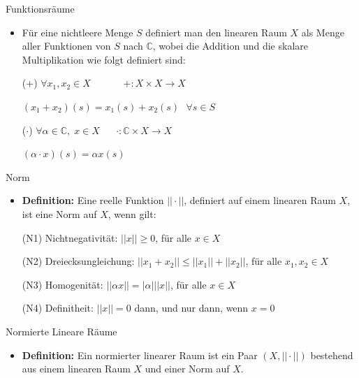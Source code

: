 \documentclass[14pt, aspectratio=169, handout]{beamer}
\begin{document}
\begin{frame}{Funktionsräume}

\begin{itemize}
    \item Für eine nichtleere Menge $S$ definiert man den linearen Raum $X$ als Menge aller Funktionen von $S$ nach $\mathbb{C}$, wobei die Addition und die skalare Multiplikation wie folgt definiert sind:
    \item[] 
    \item[(+)] $\forall x_1, x_2 \in X \hspace{40pt} +:X \times X \to X \hspace{12pt} $
    \item[] $(x_1 + x_2)(s) = x_1(s) + x_2(s) \hspace{8pt} \forall s \in S$
    \item[] 
    \item[($\cdot$)] $\forall \alpha \in \mathbb{C}, \; x \in X \hspace{20pt} \cdot : \mathbb{C} \times X \to X \hspace{14pt} $
    \item[] $(\alpha \cdot x)(s) = \alpha x(s)$
\end{itemize}
\end{frame}

\begin{frame}{Norm}
\begin{itemize}
    \item \textbf{Definition:} Eine reelle Funktion $||\cdot ||$, definiert auf einem linearen Raum $X$, ist eine Norm auf $X$, wenn gilt:
    \item[] 
    \item[(N1)] Nichtnegativität: $||x|| \geq 0$, für alle $x\in X$
    \item[(N2)] Dreiecksungleichung: $||x_1 + x_2|| \leq ||x_1|| + ||x_2||$, für alle $x_1, x_2\in X$
    \item[(N3)] Homogenität: $||\alpha x|| = |\alpha| ||x||$, für alle $x\in X$
    \item[(N4)] Definitheit: $||x||=0$ dann, und nur dann, wenn $x=0$

\end{itemize}
\end{frame}

\begin{frame}{Normierte Lineare Räume}
    \begin{itemize}
        \item \textbf{Definition:} Ein normierter linearer Raum ist ein Paar $(X, ||\cdot||)$ bestehend aus einem linearen Raum $X$ und einer Norm auf $X$.
    \end{itemize}
\end{frame}
\end{document}
